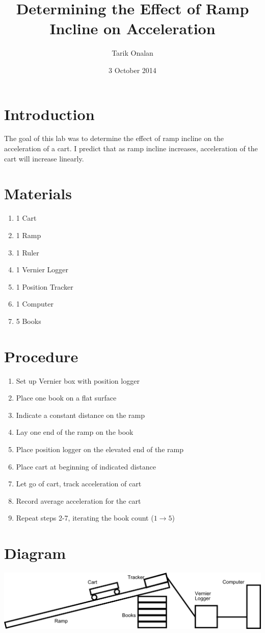 \documentclass{article}
\title{Determining the Effect of Ramp Incline on Acceleration}
\date{3 October 2014}
\author{Tarik Onalan}
\begin{document}
    \maketitle
    \section{Introduction}
        The goal of this lab was to determine the effect of ramp incline on the
        acceleration of a cart. I predict that as ramp incline increases, acceleration
        of the cart will increase linearly.
    \section{Materials}
        \begin{enumerate}
            \item 1 Cart
            \item 1 Ramp
            \item 1 Ruler
            \item 1 Vernier Logger
            \item 1 Position Tracker
            \item 1 Computer
            \item 5 Books
        \end{enumerate}
    \section{Procedure}
        \begin{enumerate}
            \item Set up Vernier box with position logger
            \item Place one book on a flat surface
            \item Indicate a constant distance on the ramp
            \item Lay one end of the ramp on the book
            \item Place position logger on the elevated end of the ramp
            \item Place cart at beginning of indicated distance
            \item Let go of cart, track acceleration of cart
            \item Record average acceleration for the cart
            \item Repeat steps 2-7, iterating the book count (\(1\to5\))
        \end{enumerate}
    \section{Diagram}
        \includegraphics[width=\textwidth]{diagram}
\end{document}
